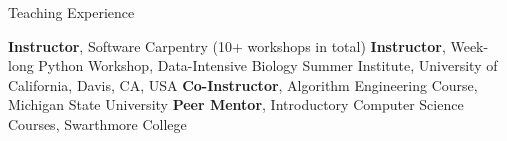 \begin{rubric}{Teaching Experience}

\entry*[2015 -- Present] \textbf{Instructor}, Software Carpentry (10+ workshops in total)
%
\entry*[Summer 2017] \textbf{Instructor}, Week-long Python Workshop, Data-Intensive Biology Summer Institute, University of California, Davis, CA, USA
%
\entry*[Spring 2016] \textbf{Co-Instructor}, Algorithm Engineering Course, Michigan State University 
%
\entry*[2011 -- 2012] \textbf{Peer Mentor}, Introductory Computer Science Courses, Swarthmore College 

%
%
\end{rubric}